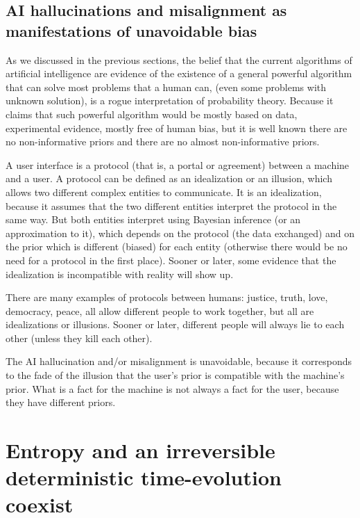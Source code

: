 \documentclass[11pt]{book}
\begin{document}
\hypertarget{ai-hallucinations-and-misalignment-as-manifestations-of-unavoidable-bias}{%
\section{AI hallucinations and misalignment as manifestations of
unavoidable
bias}\label{ai-hallucinations-and-misalignment-as-manifestations-of-unavoidable-bias}}

As we discussed in the previous sections, the belief that the current
algorithms of artificial intelligence are evidence of the existence of a
general powerful algorithm that can solve most problems that a human
can, (even some problems with unknown solution), is a rogue
interpretation of probability theory. Because it claims that such
powerful algorithm would be mostly based on data, experimental evidence,
mostly free of human bias, but it is well known there are no
non-informative priors and there are no almost non-informative priors.

A user interface is a protocol (that is, a portal or agreement) between
a machine and a user. A protocol can be defined as an idealization or an
illusion, which allows two different complex entities to communicate. It
is an idealization, because it assumes that the two different entities
interpret the protocol in the same way. But both entities interpret
using Bayesian inference (or an approximation to it), which depends on
the protocol (the data exchanged) and on the prior which is different
(biased) for each entity (otherwise there would be no need for a
protocol in the first place). Sooner or later, some evidence that the
idealization is incompatible with reality will show up.

There are many examples of protocols between humans: justice, truth,
love, democracy, peace, all allow different people to work together, but
all are idealizations or illusions. Sooner or later, different people
will always lie to each other (unless they kill each other).

The AI hallucination and/or misalignment is unavoidable, because it
corresponds to the fade of the illusion that the user's prior is
compatible with the machine's prior. What is a fact for the machine is
not always a fact for the user, because they have different priors.

\chapter{Entropy and an irreversible deterministic time-evolution coexist}
\end{document}

